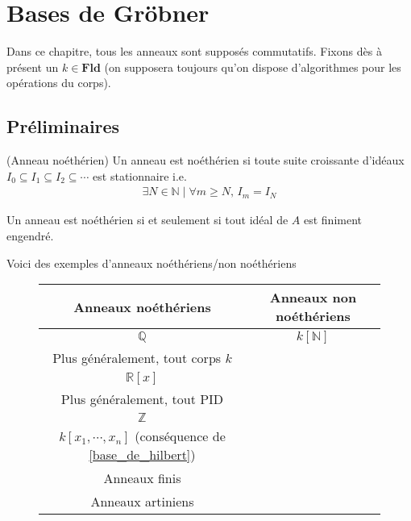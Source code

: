 \chapter{Bases de Gröbner}
    Dans ce chapitre, tous les anneaux sont supposés commutatifs. Fixons dès à présent un $k \in \mathbf{Fld}$ (on supposera toujours qu'on dispose d'algorithmes pour les opérations du corps). 
    \section{Préliminaires}
        \begin{defi} (Anneau noéthérien)
            Un anneau est noéthérien si toute suite croissante d'idéaux $I_0 \subseteq I_1 \subseteq I_2 \subseteq \cdots$ est stationnaire i.e. 
            \begin{align*}
                \exists N \in \mathbb{N} \mid \forall m \geq N,\, I_m = I_N 
            \end{align*}
        \end{defi}
        \begin{prop}
            Un anneau est noéthérien si et seulement si tout idéal de $A$ est finiment engendré. 
        \end{prop}
        \begin{expl}
            Voici des exemples d'anneaux noéthériens/non noéthériens
            \begin{figure}[H]
                \centering
                \begin{tabular}{c|c}
                    Anneaux noéthériens & Anneaux non noéthériens \\
                    \hline
                    $\mathbb{Q}$ & $k[\mathbb{N}]$ \\
                    Plus généralement, tout corps $k$ & \\
                    $\mathbb{R}[x]$ & \\
                    Plus généralement, tout PID & \\
                    $\mathbb{Z}$ & \\
                    $k[x_1, \cdots, x_n]$ (conséquence de \ref{base_de_hilbert}) & \\
                    Anneaux finis & \\
                    Anneaux artiniens & \\
                \end{tabular}
            \end{figure}
        \end{expl}
